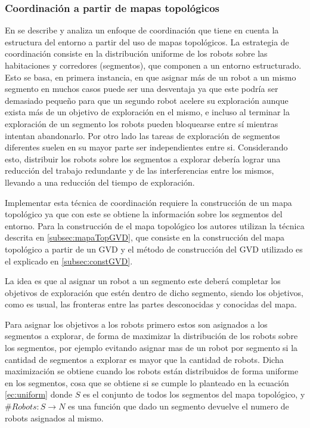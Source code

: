 \subsubsection{Coordinación a partir de mapas topológicos}

En \cite{wurm2008coordinated} se describe y analiza un enfoque de coordinación que tiene en cuenta la estructura del entorno a partir del uso de mapas topológicos. La estrategia de coordinación consiste en la distribución uniforme de los robots sobre las habitaciones y corredores (segmentos), que componen a un entorno estructurado. Esto se basa, en primera instancia, en que asignar más de un robot a un mismo segmento en muchos casos puede ser una desventaja ya que este podría ser demasiado pequeño para que un segundo robot acelere su exploración aunque exista más de un objetivo de exploración en el mismo, e incluso al terminar la exploración de un segmento los robots pueden bloquearse entre sí mientras intentan abandonarlo. Por otro lado las tareas de exploración de segmentos diferentes suelen en su mayor parte ser independientes entre si. Considerando esto, distribuir los robots sobre los segmentos a explorar debería lograr una reducción del trabajo redundante y de las interferencias entre los mismos, llevando a una reducción del tiempo de exploración.

Implementar esta técnica de coordinación requiere la construcción de un mapa topológico ya que con este se obtiene la información sobre los segmentos del entorno. Para la construcción de el mapa topológico los autores utilizan la técnica descrita en \ref{subsec:mapaTopGVD}, que consiste en la construcción del mapa topológico a partir de un GVD y el método de construcción del GVD utilizado es el explicado en \ref{subsec:constGVD}.

La idea es que al asignar un robot a un segmento este deberá completar los objetivos de exploración que estén dentro de dicho segmento, siendo los objetivos, como es usual, las fronteras entre las partes desconocidas y conocidas del mapa. 

Para asignar los objetivos a los robots primero estos son asignados a los segmentos a explorar, de forma de maximizar la distribución de los robots sobre los segmentos, por ejemplo evitando asignar mas de un robot por segmento si la cantidad de segmentos a explorar es mayor que la cantidad de robots. Dicha maximización se obtiene cuando los robots están distribuidos de forma uniforme en los segmentos, cosa que se obtiene si se cumple lo planteado en la ecuación \ref{ec:uniform} donde $S$ es el conjunto de todos los segmentos del mapa topológico, y $\#Robots : S \rightarrow N$ es una función que dado un segmento devuelve el numero de robots asignados al mismo. 

